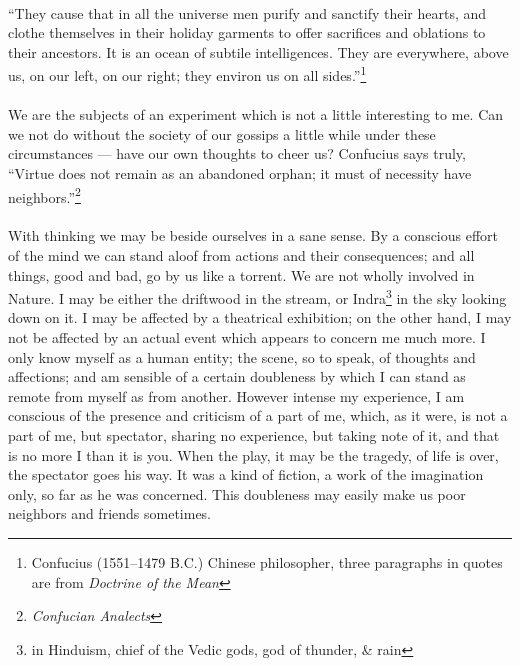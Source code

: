 \documentclass[letterpaper,12pt]{article}
\begin{document}
\paragraph{}
\enquote{They cause that in all the universe men purify and sanctify their
    hearts, and clothe themselves in their holiday garments to offer sacrifices
    and oblations to their ancestors. It is an ocean of subtile intelligences.
    They are everywhere, above us, on our left, on our right; they environ us on
    all sides.}\footnote{Confucius (1551--1479 B.C.) Chinese philosopher, three
    paragraphs in quotes are from \textit{Doctrine of the Mean}}

\paragraph{}
We are the subjects of an experiment which is not a little interesting to me.
Can we not do without the society of our gossips a little while under these
circumstances --- have our own thoughts to cheer us? Confucius says truly,
\enquote{Virtue does not remain as an abandoned orphan; it must of necessity
    have neighbors.}\footnote{\textit{Confucian Analects}}

\paragraph{}
With thinking we may be beside ourselves in a sane sense. By a conscious effort
of the mind we can stand aloof from actions and their consequences; and all
things, good and bad, go by us like a torrent. We are not wholly involved in
Nature. I may be either the driftwood in the stream, or Indra\footnote{in
    Hinduism, chief of the Vedic gods, god of thunder, \& rain} in the sky
looking down on it. I may be affected by a theatrical exhibition; on the other
hand, I may not be affected by an actual event which appears to concern me much
more. I only know myself as a human entity; the scene, so to speak, of thoughts
and affections; and am sensible of a certain doubleness by which I can stand as
remote from myself as from another. However intense my experience, I am
conscious of the presence and criticism of a part of me, which, as it were, is
not a part of me, but spectator, sharing no experience, but taking note of it,
and that is no more I than it is you. When the play, it may be the tragedy, of
life is over, the spectator goes his way. It was a kind of fiction, a work of
the imagination only, so far as he was concerned. This doubleness may easily
make us poor neighbors and friends sometimes.
\end{document}
